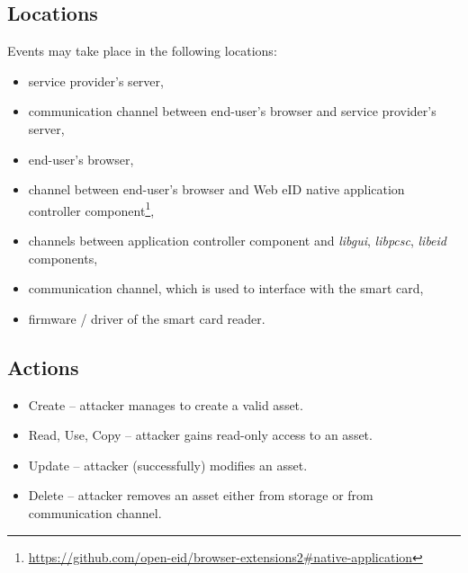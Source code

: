 \subsection{Locations}
Events may take place in the following locations:
\begin{itemize}
\item service provider's server,
\item communication channel between end-user's browser and service provider's server,
\item end-user's browser,
\item channel between end-user's browser and Web eID native application controller component\footnote{\url{https://github.com/open-eid/browser-extensions2\#native-application}},
\item channels between application controller component and \emph{libgui}, \emph{libpcsc}, \emph{libeid} components,
\item communication channel, which is used to interface with the smart card,
\item firmware / driver of the smart card reader.
\end{itemize}


\subsection{Actions}
\begin{itemize}
	\item Create -- attacker manages to create a valid asset.
	\item Read, Use, Copy -- attacker gains read-only access to an asset.
	\item Update -- attacker (successfully) modifies an asset.
	\item Delete -- attacker removes an asset either from storage or from communication channel.
\end{itemize}


